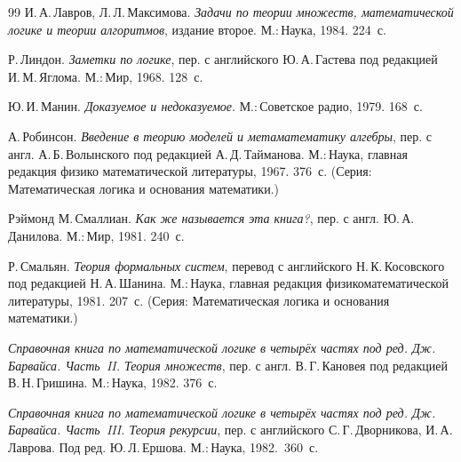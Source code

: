 \begin{thebibliography}{99}
И.\,А.\,Лавров, Л.\,Л.\,Максимова. \textit{Задачи по теории
множеств, математической логике и теории алгоритмов}, издание
второе. М.:\,Наука, 1984. 224~с.


Р.\,Линдон. \textit{Заметки по логике}, пер. с английского
Ю.\,А.\,Гас\-те\-ва под редакцией И.\,М.\,Яглома. М.:\,Мир, 1968.
128~с.


Ю.\,И.\,Манин. \textit{Доказуемое и недоказуемое}.
М.:\,Со\-вет\-с\-кое радио, 1979. 168~с.


А.\,Робинсон. \textit{Введение в теорию моделей и метаматематику
алгебры}, пер. с англ. А.\,Б.\,Волынского под редакцией
А.\,Д.\,Тай\-ма\-но\-ва. М.:\,Нау\-ка, главная редакция физико\д
математической литературы, 1967. 376~с. (Серия: Математическая
логика и основания математики.)


Рэймонд М.\,Смаллиан. \textit{Как же называется эта книга?},
пер. с англ. Ю.\,А.\,Данилова. М.:\,Мир, 1981. 240~с.


Р.\,Смальян.
\textit{Теория формальных систем}, перевод с английского
Н.\,К.\,Ко\-совс\-ко\-го под редакцией Н.\,А.\,Ша\-ни\-на. М.:\,Наука,
главная редакция физико\д математической литературы, 1981.
207~с. (Серия: Математическая логика и основания математики.)


\textit{Справочная книга по математической логике в четырёх частях
под ред. Дж.\,Барвайса. Часть~II. Теория множеств},
пер. с англ. В.\,Г.\,Кановея под редакцией
В.\,Н.\,Гришина. М.:\,Наука, 1982. 376~с.

\textit{Справочная книга по математической логике в четырёх частях под
ред. Дж.\,Барвайса. Часть~III. Теория рекурсии},
пер. с английского  С.\,Г.\,Дворникова, И.\,А.\,Лав\-ро\-ва.
Под ред. Ю.\,Л.\,Ер\-шо\-ва.
М.:\,Наука, 1982.\ 360~с.


\end{thebibliography}
